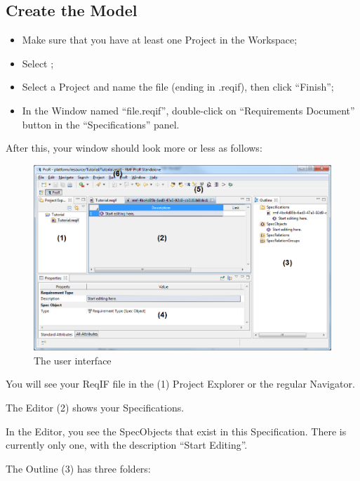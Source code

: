 \subsection{Create the Model}

\begin{itemize}

\item
  Make sure that you have at least one Project in the Workspace;
\item
  Select ;
\item
  Select a Project and name the file (ending in .reqif), then click
  ``Finish'';
\item
  In the Window named ``file.reqif'', double-click on ``Requirements
  Document'' button in the ``Specifications'' panel.
\end{itemize}

After this, your window should look more or less as follows:

\begin{figure}[h!]
  \centering
  \includegraphics[width=\linewidth]{../rmf-images/pror-screenshot.png}
  \caption{The \pror{} user interface}
  \label{fig:user_interface_overview}
\end{figure}

You will see your ReqIF file in the (1) Project Explorer or the regular
Navigator.

The Editor (2) shows your Specifications.

In the Editor, you see the SpecObjects that exist in this Specification.
There is currently only one, with the description ``Start Editing''.

The Outline (3) has three folders:

